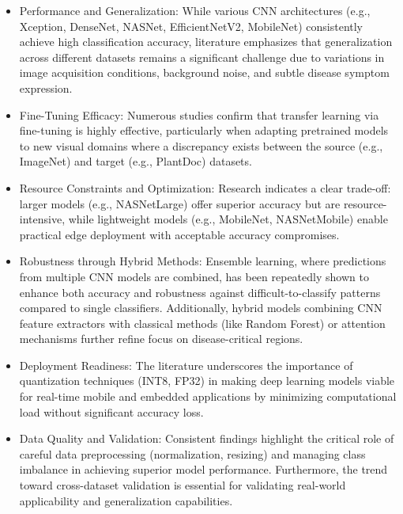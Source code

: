 \documentclass[12pt, a4paper]{report}
\begin{document}
\begin{itemize}
    \item Performance and Generalization: While various CNN architectures (e.g., Xception, DenseNet, NASNet, EfficientNetV2, MobileNet) consistently achieve high classification accuracy, literature emphasizes that generalization across different datasets remains a significant challenge due to variations in image acquisition conditions, background noise, and subtle disease symptom expression.
    \item Fine-Tuning Efficacy: Numerous studies confirm that transfer learning via fine-tuning is highly effective, particularly when adapting pretrained models to new visual domains where a discrepancy exists between the source (e.g., ImageNet) and target (e.g., PlantDoc) datasets.
    \item Resource Constraints and Optimization: Research indicates a clear trade-off: larger models (e.g., NASNetLarge) offer superior accuracy but are resource-intensive, while lightweight models (e.g., MobileNet, NASNetMobile) enable practical edge deployment with acceptable accuracy compromises.
    \item Robustness through Hybrid Methods: Ensemble learning, where predictions from multiple CNN models are combined, has been repeatedly shown to enhance both accuracy and robustness against difficult-to-classify patterns compared to single classifiers. Additionally, hybrid models combining CNN feature extractors with classical methods (like Random Forest) or attention mechanisms further refine focus on disease-critical regions.
    \item Deployment Readiness: The literature underscores the importance of quantization techniques (INT8, FP32) in making deep learning models viable for real-time mobile and embedded applications by minimizing computational load without significant accuracy loss.
    \item Data Quality and Validation: Consistent findings highlight the critical role of careful data preprocessing (normalization, resizing) and managing class imbalance in achieving superior model performance. Furthermore, the trend toward cross-dataset validation is essential for validating real-world applicability and generalization capabilities.
\end{itemize}
\end{document}

